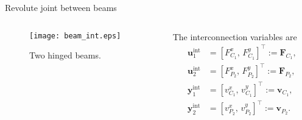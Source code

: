\documentclass[aspectratio=169]{ISAE-Beamer}
\begin{document}
\begin{frame}{Revolute joint between beams}
\begin{columns}
	\begin{column}{0.5\textwidth}
		\begin{tcolorbox}
			\begin{figure}[t]
				\centering
				\texttt{[image: beam\_int.eps]} 
				\caption{Two hinged beams.}
				\label{fig:beam_int}
			\end{figure}
		\end{tcolorbox}
	\end{column}
	\begin{column}{0.5\textwidth}
	The interconnection variables are
	\begin{equation*}
	\begin{aligned}
	\mathbf{u}_1^{\text{int}} &= [F^x_{C_1}, \, F^y_{C_1}]^\top := \mathbf{F}_{C_1}, \\
	\mathbf{u}_2^{\text{int}} &= [F^x_{P_2}, \, F^y_{P_2}]^\top := \mathbf{F}_{P_2}, \\
	\mathbf{y}_1^{\text{int}} &= [v^x_{C_1}, \, v^y_{C_1}]^\top := \mathbf{v}_{C_1}, \\
	\mathbf{y}_2^{\text{int}} &= [v^x_{P_2}, \, v^y_{P_2}]^\top := \mathbf{v}_{P_2}.
	\end{aligned}
	\end{equation*}
	
	\end{column}
\end{columns}

\end{frame}
\end{document}
